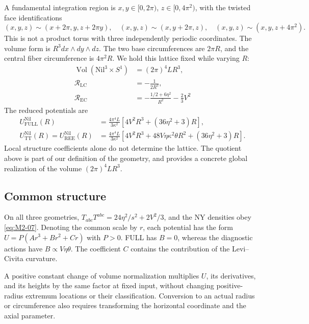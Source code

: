A fundamental integration region is
$x,y\in[0,2\pi)$, $z\in[0,4\pi^2)$, with the twisted face identifications
\begin{equation}
(x,y,z)\sim(x+2\pi,y,z+2\pi y),\quad
(x,y,z)\sim(x,y+2\pi,z),\quad
(x,y,z)\sim(x,y,z+4\pi^2).
\tag{M3-08}\label{eq:M3-08}
\end{equation}
This is not a product torus with three independently periodic coordinates.
The volume form is $R^3dx\wedge dy\wedge dz$.
The two base circumferences are $2\pi R$, and the central fiber circumference
is $4\pi^2R$. We hold this lattice fixed while varying $R$:
\begin{equation}
\begin{aligned}
\operatorname{Vol}(\mathrm{Nil}^3\times S^1)&=(2\pi)^4LR^3,\\
\mathcal R_{\mathrm{LC}}&=-\frac1{2R^2},\\
\mathcal R_{\mathrm{EC}}&=-\frac{1/2+6\eta^2}{R^2}-\frac23V^2
\end{aligned}
\tag{M3-09}\label{eq:M3-09}
\end{equation}
The reduced potentials are
\begin{equation}
\begin{aligned}
U^{\mathrm{Nil}}_{\mathrm{FULL}}(R)
 &=\frac{4\pi^4L}{3\kappa^2}
   \left[4V^2R^3+(36\eta^2+3)R\right],\\
U^{\mathrm{Nil}}_{\mathrm{TT}}(R)=U^{\mathrm{Nil}}_{\mathrm{REE}}(R)
 &=\frac{4\pi^4L}{3\kappa^2}
   \left[4V^2R^3+48V\eta\kappa^2\theta R^2+(36\eta^2+3)R\right].
\end{aligned}
\tag{M3-10}\label{eq:M3-10}
\end{equation}
Local structure coefficients alone do not determine the lattice.
The quotient above is part of our definition of the geometry, and provides
a concrete global realization of the volume $(2\pi)^4LR^3$.

\subsection{Common structure}
On all three geometries,
$T_{abc}T^{abc}=24\eta^2/s^2+2V^2/3$, and the NY densities obey
\eqref{eq:M2-07}. Denoting the common scale by $r$, each potential has
the form $U=P(Ar^3+Br^2+Cr)$ with $P>0$.
FULL has $B=0$, whereas the diagnostic actions have
$B\propto V\eta\theta$. The coefficient $C$ contains the contribution
of the Levi--Civita curvature.

A positive constant change of volume normalization multiplies $U$,
its derivatives, and its heights by the same factor at fixed input,
without changing positive-radius extremum locations or their classification.
Conversion to an actual radius or circumference also requires transforming
the horizontal coordinate and the axial parameter.

